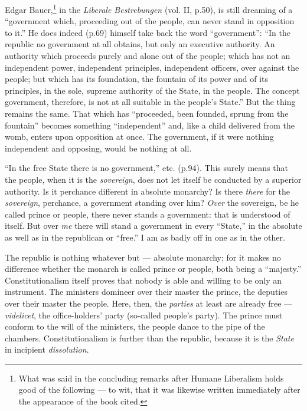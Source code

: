 Edgar Bauer,\footnote{What was said in the concluding remarks after Humane 
Liberalism holds good of the following --- to wit, that it was likewise written 
immediately after the appearance of the book cited.} in the \textit{Liberale 
Bestrebungen} (vol. II, p.50), is still dreaming of a ``government which, 
proceeding out of the people, can never stand in opposition to it.'' He does 
indeed (p.69) himself take back the word ``government'': ``In the republic 
no government at all obtains, but only an executive authority. An authority 
which proceeds purely and alone out of the people; which has not an 
independent power, independent principles, independent officers, over against 
the people; but which has its foundation, the fountain of its power and of its 
principles, in the sole, supreme authority of the State, in the people. The 
concept government, therefore, is not at all suitable in the people's 
State.'' But the thing remains the same. That which has ``proceeded, been 
founded, sprung from the fountain'' becomes something ``independent'' and, 
like a child delivered from the womb, enters upon opposition at once. The 
government, if it were nothing independent and opposing, would be nothing at 
all.

``In the free State there is no government,'' etc. (p.94). This surely means 
that the people, when it is the \textit{sovereign}, does not let itself be 
conducted by a superior authority. Is it perchance different in absolute 
monarchy? Is there \textit{there} for the \textit{sovereign}, perchance, a 
government standing over him? \textit{Over} the sovereign, be he called prince 
or people, there never stands a government: that is understood of itself. But 
over \textit{me} there will stand a government in every ``State,'' in the 
absolute as well as in the republican or ``free.'' I am as badly off in one 
as in the other.

The republic is nothing whatever but --- absolute monarchy; for it makes no 
difference whether the monarch is called prince or people, both being a 
``majesty.'' Constitutionalism itself proves that nobody is able and willing 
to be only an instrument. The ministers domineer over their master the prince, 
the deputies over their master the people. Here, then, the \textit{parties} at 
least are already free --- \textit{videlicet}, the office-holders' party 
(so-called people's party). The prince must conform to the will of the 
ministers, the people dance to the pipe of the chambers. Constitutionalism is 
further than the republic, because it is the \textit{State} in incipient 
\textit{dissolution}.

